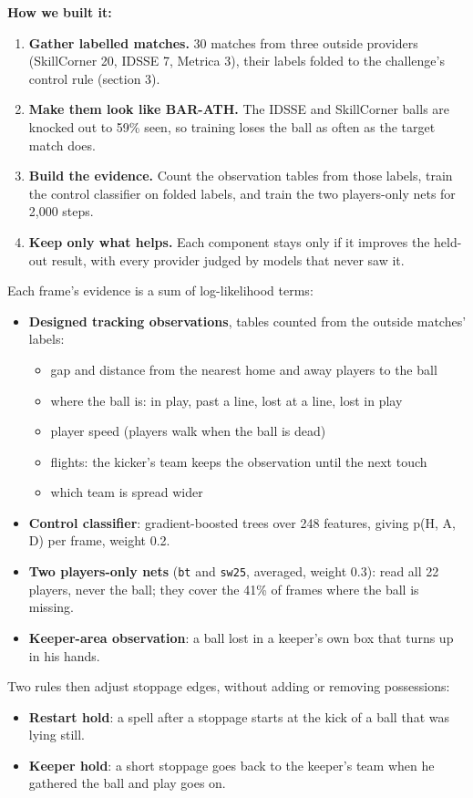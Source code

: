 \documentclass[11pt,a4paper]{article}
\newcommand{\code}[1]{\texttt{#1}}
\begin{document}
\textbf{How we built it:}
\begin{enumerate}
  \item \textbf{Gather labelled matches.} 30 matches from three outside providers (SkillCorner 20, IDSSE 7, Metrica 3), their labels folded to the challenge's control rule (section 3).
  \item \textbf{Make them look like BAR-ATH.} The IDSSE and SkillCorner balls are knocked out to 59\% seen, so training loses the ball as often as the target match does.
  \item \textbf{Build the evidence.} Count the observation tables from those labels, train the control classifier on folded labels, and train the two players-only nets for 2,000 steps.
  \item \textbf{Keep only what helps.} Each component stays only if it improves the held-out result, with every provider judged by models that never saw it.
\end{enumerate}

Each frame's evidence is a sum of log-likelihood terms:
\begin{itemize}
  \item \textbf{Designed tracking observations}, tables counted from the outside matches' labels:
  \begin{itemize}
    \item gap and distance from the nearest home and away players to the ball
    \item where the ball is: in play, past a line, lost at a line, lost in play
    \item player speed (players walk when the ball is dead)
    \item flights: the kicker's team keeps the observation until the next touch
    \item which team is spread wider
  \end{itemize}
  \item \textbf{Control classifier}: gradient-boosted trees over 248 features, giving p(H, A, D) per frame, weight 0.2.
  \item \textbf{Two players-only nets} (\code{bt} and \code{sw25}, averaged, weight 0.3): read all 22 players, never the ball; they cover the 41\% of frames where the ball is missing.
  \item \textbf{Keeper-area observation}: a ball lost in a keeper's own box that turns up in his hands.
\end{itemize}

Two rules then adjust stoppage edges, without adding or removing possessions:
\begin{itemize}
  \item \textbf{Restart hold}: a spell after a stoppage starts at the kick of a ball that was lying still.
  \item \textbf{Keeper hold}: a short stoppage goes back to the keeper's team when he gathered the ball and play goes on.
\end{itemize}
\end{document}
